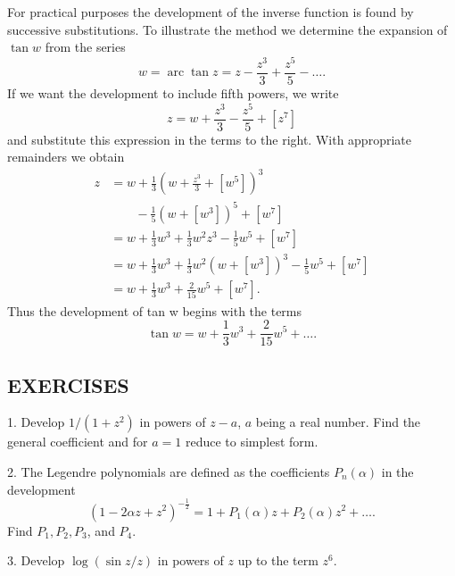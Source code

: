 For practical purposes the development of the inverse function is found by successive substitutions. To illustrate the method we determine the expansion of $\tan w$ from the series
\begin{equation*}
w = \operatorname{arc} \tan z = z - \frac {z ^ {3}}{3} + \frac {z ^ {5}}{5} - \dots .
\end{equation*}
If we want the development to include fifth powers, we write
\begin{equation*}
z = w + \frac {z ^ {3}}{3} - \frac {z ^ {5}}{5} + [ z ^ {7} ]
\end{equation*}
and substitute this expression in the terms to the right. With appropriate remainders we obtain
\begin{equation*}
\begin{aligned}
z&=w+\frac13\left(w+\frac{z^3}3+[w^5]\right)^3\\
&\qquad-\frac15(w+[w^3])^5+[w^7]\\
&=w+\frac13w^3+\frac13w^2z^3-\frac15w^5+[w^7]\\
&=w+\frac13w^3+\frac13w^2(w+[w^3])^3-\frac15w^5+[w^7]\\
&=w+\frac13w^3+\frac{2}{15}w^5+[w^7].
\end{aligned}
\end{equation*}
Thus the development of tan w begins with the terms
\begin{equation*}
\tan w = w + \frac {1}{3} w ^ {3} + \frac {2}{15} w ^ {5} + \dots .
\end{equation*}
\subsection*{EXERCISES}
1. Develop $1/(1+z^{2})$ in powers of $z-a$, $a$ being a real number. Find the general coefficient and for $a=1$ reduce to simplest form.

2. The Legendre polynomials are defined as the coefficients $P_{n}(\alpha)$ in the development
\begin{equation*}
(1 - 2 \alpha z + z ^ {2}) ^ {- \frac {1}{2}} = 1 + P _ {1} (\alpha) z + P _ {2} (\alpha) z ^ {2} + \dots .
\end{equation*}
Find $P_{1}, P_{2}, P_{3}$, and $P_{4}$.

3. Develop $\log(\sin z/z)$ in powers of $z$ up to the term $z^{6}$.

